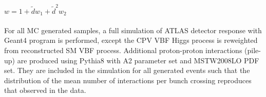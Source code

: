\begin{center}
\begin{math}
w = 1+\tilde{d}w_1 + \tilde{d}^2w_2
\end{math}
\end{center}

\paragraph{} For all  MC generated samples, a full simulation of ATLAS detector response with Geant4 program is performed, except the CPV VBF Higgs process is reweighted from reconstructed SM VBF process. Additional proton-proton interactions (pile-up) are produced using Pythia8 with A2 parameter set and MSTW2008LO PDF set. They are included in the simulation for all generated events such that the distribution of the mean number of interactions per bunch crossing reproduces that observed in the data.

